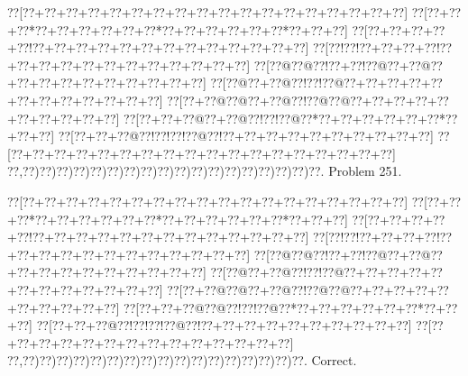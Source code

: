 \documentclass[a5paper]{article}
\begin{document}
\newpage
\begin{center}
{\goo
\0??[\0??+\0??+\0??+\0??+\0??+\0??+\0??+\0??+\0??+\0??+\0??+\0??+\0??+\0??+\0??+\0??+\0??+\0??]
\0??[\0??+\0??+\0??*\0??+\0??+\0??+\0??+\0??+\0??*\0??+\0??+\0??+\0??+\0??+\0??*\0??+\0??+\0??]
\0??[\0??+\0??+\0??+\0??+\0??!\0??+\0??+\0??+\0??+\0??+\0??+\0??+\0??+\0??+\0??+\0??+\0??+\0??]
\0??[\0??!\0??!\0??+\0??+\0??+\0??!\0??+\0??+\0??+\0??+\0??+\0??+\0??+\0??+\0??+\0??+\0??+\0??]
\0??[\0??@\0??@\0??!\0??+\0??!\0??@\0??+\0??@\0??+\0??+\0??+\0??+\0??+\0??+\0??+\0??+\0??+\0??]
\0??[\0??@\0??+\0??@\0??!\0??!\0??@\0??+\0??+\0??+\0??+\0??+\0??+\0??+\0??+\0??+\0??+\0??+\0??]
\0??[\0??+\0??@\0??@\0??+\0??@\0??!\0??@\0??@\0??+\0??+\0??+\0??+\0??+\0??+\0??+\0??+\0??+\0??]
\0??[\0??+\0??+\0??@\0??+\0??@\0??!\0??!\0??@\0??*\0??+\0??+\0??+\0??+\0??+\0??*\0??+\0??+\0??]
\0??[\0??+\0??+\0??@\0??!\0??!\0??!\0??@\0??!\0??+\0??+\0??+\0??+\0??+\0??+\0??+\0??+\0??+\0??]
\0??[\0??+\0??+\0??+\0??+\0??+\0??+\0??+\0??+\0??+\0??+\0??+\0??+\0??+\0??+\0??+\0??+\0??+\0??]
\0??,\0??)\0??)\0??)\0??)\0??)\0??)\0??)\0??)\0??)\0??)\0??)\0??)\0??)\0??)\0??)\0??)\0??)\0??.
}
Problem 251.

\end{center}
\begin{center}
{\goo
\0??[\0??+\0??+\0??+\0??+\0??+\0??+\0??+\0??+\0??+\0??+\0??+\0??+\0??+\0??+\0??+\0??+\0??+\0??]
\0??[\0??+\0??+\0??*\0??+\0??+\0??+\0??+\0??+\0??*\0??+\0??+\0??+\0??+\0??+\0??*\0??+\0??+\0??]
\0??[\0??+\0??+\0??+\0??+\0??!\0??+\0??+\0??+\0??+\0??+\0??+\0??+\0??+\0??+\0??+\0??+\0??+\0??]
\0??[\0??!\0??!\0??+\0??+\0??+\0??!\0??+\0??+\0??+\0??+\0??+\0??+\0??+\0??+\0??+\0??+\0??+\0??]
\0??[\0??@\0??@\0??!\0??+\0??!\0??@\0??+\0??@\0??+\0??+\0??+\0??+\0??+\0??+\0??+\0??+\0??+\0??]
\0??[\0??@\0??+\0??@\0??!\0??!\0??@\0??+\0??+\0??+\0??+\0??+\0??+\0??+\0??+\0??+\0??+\0??+\0??]
\0??[\0??+\0??@\0??@\0??+\0??@\0??!\0??@\0??@\0??+\0??+\0??+\0??+\0??+\0??+\0??+\0??+\0??+\0??]
\0??[\0??+\0??+\0??@\0??@\0??!\0??!\0??@\0??*\0??+\0??+\0??+\0??+\0??+\0??*\0??+\0??+\0??]
\0??[\0??+\0??+\0??@\0??!\0??!\0??!\0??@\0??!\0??+\0??+\0??+\0??+\0??+\0??+\0??+\0??+\0??+\0??]
\0??[\0??+\0??+\0??+\0??+\0??+\0??+\0??+\0??+\0??+\0??+\0??+\0??+\0??+\0??]
\0??,\0??)\0??)\0??)\0??)\0??)\0??)\0??)\0??)\0??)\0??)\0??)\0??)\0??)\0??)\0??)\0??)\0??.
}
Correct. 

\end{center}
\end{document}
